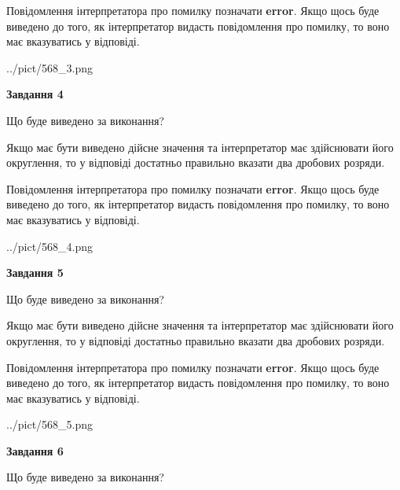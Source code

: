 \documentclass[12pt, ukrainian]{article}
\begin{document}
{\begin {Large}
Повідомлення інтерпретатора про помилку позначати \textbf{error}.
Якщо щось буде виведено до того, як інтерпретатор видасть повідомлення про помилку, 
то воно має вказуватись у відповіді. \par

\begin{center}
	{../pict/568_3.png}
\end{center}
\newpage

{\begin {center}\textbf{Завдання 4}\end {center}}\par
Що буде виведено за виконання? \par

Якщо має бути виведено дійсне значення та інтерпретатор має здійснювати його округлення, 
то у відповіді достатньо правильно вказати два дробових розряди.

Повідомлення інтерпретатора про помилку позначати \textbf{error}.
Якщо щось буде виведено до того, як інтерпретатор видасть повідомлення про помилку, 
то воно має вказуватись у відповіді. \par

\begin{center}
	{../pict/568_4.png}
\end{center}
\newpage

{\begin {center}\textbf{Завдання 5}\end {center}}\par
Що буде виведено за виконання? \par

Якщо має бути виведено дійсне значення та інтерпретатор має здійснювати його округлення, 
то у відповіді достатньо правильно вказати два дробових розряди.

Повідомлення інтерпретатора про помилку позначати \textbf{error}.
Якщо щось буде виведено до того, як інтерпретатор видасть повідомлення про помилку, 
то воно має вказуватись у відповіді. \par

\begin{center}
	{../pict/568_5.png}
\end{center}
\newpage

{\begin {center}\textbf{Завдання 6}\end {center}}\par
Що буде виведено за виконання? \par


\end{Large}}
\end{document}
